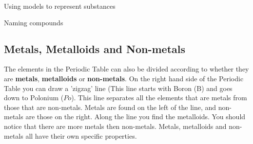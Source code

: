 \begin{activity}{Using models to represent substances}
\begin{exercise}{Naming compounds}
            \subsection{ Metals, Metalloids and Non-metals}
            \nopagebreak
      \label{m38708*id65693}The elements in the Periodic Table can also be divided according to whether they are \textbf{metals}, \textbf{metalloids} or \textbf{non-metals}. On the right hand side of the Periodic Table you can draw a 'zigzag' line (This line starts with Boron ($\mathrm{B}$) and goes down to Polonium ($Po$). This line separates all the elements that are metals from those that are non-metals. Metals are found on the left of the line, and non-metals are those on the right. Along the line you find the metalloids. You should notice that there are more metals then non-metals. Metals, metalloids and non-metals all have their own specific properties.\par 
      \label{m38708*uid76}

\end{exercise}
\end{activity}
